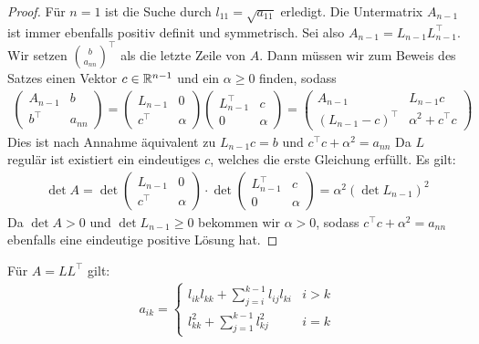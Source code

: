 \documentclass{report}
\begin{document}
\begin{proof}
	Für $n = 1$ ist die Suche durch $l_{11} = \sqrt{a_{11}}$ erledigt.
	\newpar
	Die Untermatrix $A_{n-1}$ ist immer ebenfalls positiv definit und symmetrisch. Sei also $A_{n-1} = L_{n-1}L_{n-1}^\top$. Wir setzen $\binom{b}{a_{nn}}^\top$ als die letzte Zeile von $A$. Dann müssen wir zum Beweis des Satzes einen Vektor $c \in \mathbb{R}^{n-1}$ und ein $\alpha \geq 0$ finden, sodass
	\begin{align*}
		\begin{pmatrix}
			A_{n-1} & b\\
			b^\top & a_{nn}
		\end{pmatrix}
		=
		\begin{pmatrix}
			L_{n-1} & 0\\
			c^\top & \alpha
		\end{pmatrix}
		\begin{pmatrix}
			L_{n-1}^\top & c\\
			0 & \alpha
		\end{pmatrix}
		=
		\begin{pmatrix}
			A_{n-1} & L_{n-1}c\\
			(L_{n-1} - c)^\top & \alpha^2 + c^\top c
		\end{pmatrix}
	\end{align*}
	Dies ist nach Annahme äquivalent zu $L_{n-1}c = b$ und $c^\top c + \alpha^2 = a_{nn}$
	\newpar
	Da $L$ regulär ist existiert ein eindeutiges $c$, welches die erste Gleichung erfüllt.
	Es gilt: 
	\begin{align*}
		\det A = \det \begin{pmatrix}
			L_{n-1} & 0\\
			c^\top & \alpha
		\end{pmatrix}
		\cdot
		\det
		\begin{pmatrix}
			L_{n-1}^\top & c\\
			0 & \alpha
		\end{pmatrix}
		=
		\alpha^2(\det L_{n-1})^2
	\end{align*}
	Da $\det A > 0$ und $\det L_{n-1} \geq 0$ bekommen wir $\alpha > 0$, sodass $c^\top c + \alpha^2 = a_{nn}$ ebenfalls eine eindeutige positive Lösung hat.
\end{proof}
\begin{lemma}
	Für $A = LL^\top$ gilt:
	\begin{align*}
		a_{ik} = 
		\begin{cases}
			l_{ik}l_{kk} + \sum_{j = i}^{k-1} l_{ij}l_{ki} & i > k\\
			l_{kk}^2 + \sum_{j = 1}^{k-1} l_{kj}^2 & i = k
		\end{cases} 
	\end{align*}
\end{lemma}
\end{document}
